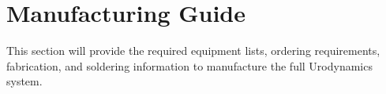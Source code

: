 \section{Manufacturing Guide}
This section will provide the required equipment lists, ordering requirements, fabrication, and soldering information to manufacture the full Urodynamics system. 




\clearpage



\clearpage






\clearpage